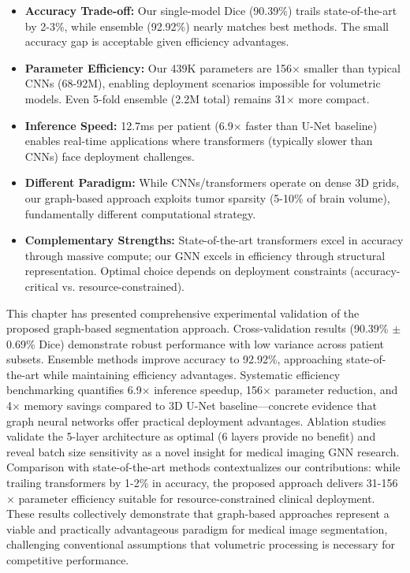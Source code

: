 \begin{itemize}
    \item \textbf{Accuracy Trade-off:} Our single-model Dice (90.39\%) trails state-of-the-art by 2-3\%, while ensemble (92.92\%) nearly matches best methods. The small accuracy gap is acceptable given efficiency advantages.
    
    \item \textbf{Parameter Efficiency:} Our 439K parameters are 156$\times$ smaller than typical CNNs (68-92M), enabling deployment scenarios impossible for volumetric models. Even 5-fold ensemble (2.2M total) remains 31$\times$ more compact.
    
    \item \textbf{Inference Speed:} 12.7ms per patient (6.9$\times$ faster than U-Net baseline) enables real-time applications where transformers (typically slower than CNNs) face deployment challenges.
    
    \item \textbf{Different Paradigm:} While CNNs/transformers operate on dense 3D grids, our graph-based approach exploits tumor sparsity (5-10\% of brain volume), fundamentally different computational strategy.
    
    \item \textbf{Complementary Strengths:} State-of-the-art transformers excel in accuracy through massive compute; our GNN excels in efficiency through structural representation. Optimal choice depends on deployment constraints (accuracy-critical vs. resource-constrained).
\end{itemize}

\vspace{5mm}

This chapter has presented comprehensive experimental validation of the proposed graph-based segmentation approach. Cross-validation results (90.39\% $\pm$ 0.69\% Dice) demonstrate robust performance with low variance across patient subsets. Ensemble methods improve accuracy to 92.92\%, approaching state-of-the-art while maintaining efficiency advantages. Systematic efficiency benchmarking quantifies 6.9$\times$ inference speedup, 156$\times$ parameter reduction, and 4$\times$ memory savings compared to 3D U-Net baseline—concrete evidence that graph neural networks offer practical deployment advantages. Ablation studies validate the 5-layer architecture as optimal (6 layers provide no benefit) and reveal batch size sensitivity as a novel insight for medical imaging GNN research. Comparison with state-of-the-art methods contextualizes our contributions: while trailing transformers by 1-2\% in accuracy, the proposed approach delivers 31-156$\times$ parameter efficiency suitable for resource-constrained clinical deployment. These results collectively demonstrate that graph-based approaches represent a viable and practically advantageous paradigm for medical image segmentation, challenging conventional assumptions that volumetric processing is necessary for competitive performance.

\clearpage